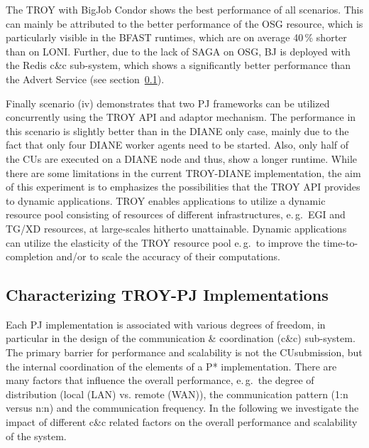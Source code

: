 \documentclass[conference,final]{IEEEtran}
\newcommand{\jhanote}[1]{ {\textcolor{red} { ***shantenu: #1 }}}
\newcommand{\alnote}[1]{ {\textcolor{blue} { ***andre: #1 }}}
\newcommand{\alnote}[1]{}
\newcommand{\jhanote}[1]{}
\newcommand{\cu}{CU}
\newcommand{\upp}{\vspace*{-0.5em}}
\begin{document}
The TROY with BigJob Condor shows the best performance of all scenarios. This
can mainly be attributed to the better performance of the OSG resource, which is
particularly visible in the BFAST runtimes, which are on average 40\,\% shorter
than on LONI. Further, due to the lack of SAGA on OSG, BJ is deployed with the
Redis c\&c sub-system, which shows a significantly better performance than the
Advert Service (see section~\ref{sec:pj_performance}).


Finally scenario (iv) demonstrates that two PJ frameworks can be
utilized concurrently using the TROY API and adaptor mechanism. The
performance in this scenario is slightly better than in the DIANE only
case, mainly due to the fact that only four DIANE worker agents need
to be started. Also, only half of the \cu s are executed on a DIANE node
and thus, show a longer runtime. While there are some limitations in
the current TROY-DIANE implementation, the aim of this experiment is
to emphasizes the possibilities that the TROY API provides to dynamic
applications. TROY enables applications to utilize a dynamic resource
pool consisting of resources of different infrastructures, e.\,g.\ EGI
and TG/XD resources, at large-scales hitherto unattainable. Dynamic
applications can utilize the elasticity of the TROY resource pool
e.\,g.\ to improve the time-to-completion and/or to scale the accuracy
of their computations.


\subsection{Characterizing TROY-PJ Implementations\upp\upp}
\label{sec:pj_performance}
Each PJ implementation is associated with various degrees of freedom,
in particular in the design of the communication \& coordination
(c\&c) sub-system.  The primary barrier for performance and
scalability is not the \cu  submission, but the internal coordination of
the elements of a P* implementation. There are many factors that
influence the overall performance, e.\,g.\ the degree of distribution
(local (LAN) vs. remote (WAN)), the communication pattern (1:n versus
n:n) and the communication frequency. In the following we investigate
the impact of different c\&c related factors on the overall
performance and scalability of the system.
\end{document}

